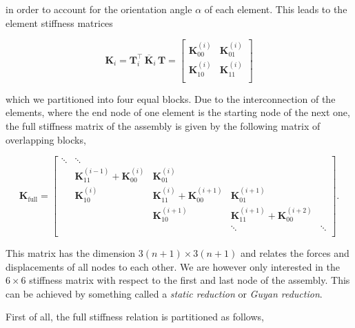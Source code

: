 in order to account for the orientation angle $\alpha$ of each element.
This leads to the element stiffness matrices

\begin{equation}
\renewcommand\arraystretch{1.5}
\boldsymbol{K}_{i} = \boldsymbol{T}_i^\intercal\,\overline{\boldsymbol{K}}_i\,\boldsymbol{T} =
\begin{bmatrix}
\boldsymbol{K}_{00}^{(i)} & \boldsymbol{K}_{01}^{(i)} \\
\boldsymbol{K}_{10}^{(i)} & \boldsymbol{K}_{11}^{(i)} \\
\end{bmatrix}
\end{equation}

which we partitioned into four equal blocks.
Due to the interconnection of the elements, where the end node of one element is the starting node of the next one, the full stiffness matrix of the assembly is given by the following matrix of overlapping blocks,

\begin{equation}
\renewcommand\arraystretch{1.5}
\boldsymbol{K}_{\mathrm{full}} = \begin{bmatrix}
\ddots & \ddots \\
& \boldsymbol{K}_{11}^{(i-1)} + \boldsymbol{K}_{00}^{(i)} & \boldsymbol{K}_{01}^{(i)} & \\
& \boldsymbol{K}_{10}^{(i)} & \boldsymbol{K}_{11}^{(i)} + \boldsymbol{K}_{00}^{(i+1)} & \boldsymbol{K}_{01}^{(i+1)} \\
&                           & \boldsymbol{K}_{10}^{(i+1)} & \boldsymbol{K}_{11}^{(i+1)} + \boldsymbol{K}_{00}^{(i+2)} \\
&                           &                             &                                          \ddots & \ddots \\
\end{bmatrix}.
\end{equation}

This matrix has the dimension $3(n+1) \times 3(n+1)$ and relates the forces and displacements of all nodes to each other.
We are however only interested in the $6 \times 6$ stiffness matrix with respect to the first and last node of the assembly.
This can be achieved by something called a \textit{static reduction} or \textit{Guyan reduction}.

First of all, the full stiffness relation is partitioned as follows,

